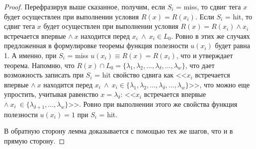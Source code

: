 \begin{proof}
  Перефразируя выше сказанное, получим, если $S_i$ = miss, то сдвиг
  тега $x$ будет осуществлен при выполнении условия $R(x) = R(x_i)$.
  Если $S_i$ = hit, то сдвиг тега $x$ будет осуществлен при
  выполнении условия $R(x) = R(x_i) \wedge x_i$ встречается впервые
  $\wedge~x$ находится перед $x_i~\wedge~x_i \in L_0$. Ровно в этих же случаях
  предложенная в формулировке теоремы функция полезности $u(x_i)$
  будет равна 1. А именно, при $S_i$ = miss $u(x_i) \equiv R(x) =
  R(x_i)$, что и утверждает теорема. Напомню, что $R(x) \cap L_0 =
  \{\lambda_1, \lambda_2, ..., \lambda_\delta, ..., \lambda_w\}$, что дает
  возможность записать при $S_i$ = hit свойство сдвига как <<$x_i$ встречается впервые
  $\wedge~x$ находится перед $x_i~\wedge~x_i \in \{\lambda_1, \lambda_2, ..., \lambda_\delta, ...,
  \lambda_w\}$>>, что можно еще упростить, учитывая равенство $x =
  \lambda_\delta$: <<$x_i$ встречается впервые
  $\wedge~x_i~\in \{\lambda_{\delta+1}, ..., \lambda_w\}$>>. Ровно
  при выполнении этого же свойства функция полезности $u(x_i) = 1$
  при $S_i$ = hit.

  В обратную сторону лемма доказывается с помощью тех же шагов, что
  и в прямую сторону.
\end{proof}

